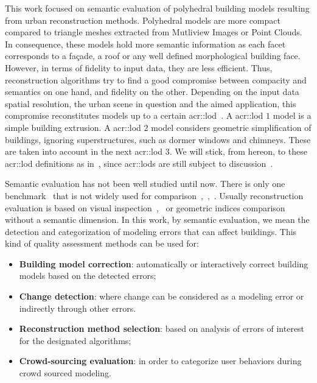 \documentclass[runningheads]{llncs}
\begin{document}
	This work focused on semantic evaluation of polyhedral building models resulting from urban reconstruction methods. Polyhedral models are more compact compared to triangle meshes extracted from Mutliview Images or Point Clouds. In consequence, these models hold more semantic information as each facet corresponds to a fa\c{c}ade, a roof or any well defined morphological building face. However, in terms of fidelity to input data, they are less efficient. Thus, reconstruction algorithms try to find a good compromise between compacity and semantics on one hand, and fidelity on the other. Depending on the input data spatial resolution, the urban scene in question and the aimed application, this compromise reconstitutes models up to a certain \acrfull{acr::lod}~\cite{kolbe2005citygml}. A \acrshort{acr::lod} $1$ model is a simple building extrusion. A \acrshort{acr::lod} $2$ model considers geometric simplification of buildings, ignoring superstructures, such as dormer windows and chimneys. These are taken into account in the next \acrshort{acr::lod} $3$. We will stick, from hereon, to these \acrshort{acr::lod} definitions as in~\cite{verdie2015lod}, since \glspl{acr::lod} are still subject to discussion~\cite{2016_ceus_improved_lod}.
	
	Semantic evaluation has not been well studied until now. There is only one benchmark~\cite{rottensteiner2014results} that is not widely used for comparison~\cite{Lafarge2012},~\cite{nguatem2017modeling},~\cite{li2016boxfitting}. Usually reconstruction evaluation is based on visual inspection~\cite{Durupt2006},~\cite{MacayMoreia2013} or geometric indices comparison~\cite{Kaartinen2005} without a semantic dimension. In this work, by semantic evaluation, we mean the detection and categorization of modeling errors that can affect buildings. This kind of quality assessment methods can be used for:
	\begin{itemize}
		\item \textbf{Building model correction}: automatically or interactively correct building models based on the detected errors;
		\item \textbf{Change detection}: where change can be considered as a modeling error or indirectly through other errors.
		\item \textbf{Reconstruction method selection}: based on analysis of errors of interest for the designated algorithms;
		\item \textbf{Crowd-sourcing evaluation}: in order to categorize user behaviors during crowd sourced modeling.
	\end{itemize}
	
\end{document}
